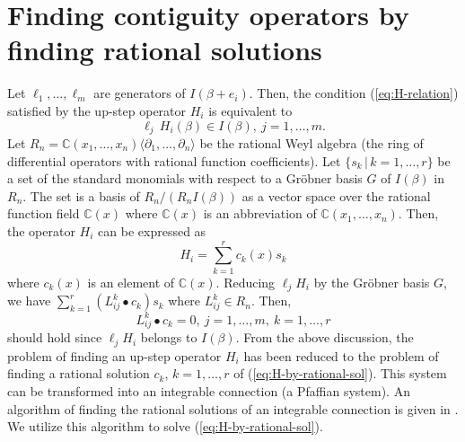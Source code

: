 \documentclass{article}
\def\CC{\mathbb{C}}
\def\pd#1{\partial_{#1}}
\begin{document}
\section{Finding contiguity operators by finding rational solutions} \label{sec:rat-sol}

Let $\ell_1, \ldots, \ell_m$ are generators of $I(\beta+e_i)$.
Then, the condition (\ref{eq:H-relation}) satisfied by the up-step operator $H_i$  
is equivalent to
\begin{equation}  \label{eq:H-relation2}
  \ell_j \, H_i(\beta) \in I(\beta), \ j=1, \ldots, m.
\end{equation}
Let $R_n=\CC(x_1, \ldots, x_n) \langle \pd{1}, \ldots, \pd{n}\rangle$
be the rational Weyl algebra (the ring of differential operators
with rational function coefficients).
Let $\{ s_k \,|\, k=1, \ldots, r\}$ be a set of the standard monomials
with respect to a Gr\"obner basis $G$ of $I(\beta)$ in $R_n$.
The set is a basis of 
$R_n/(R_n I(\beta))$ as a vector space over the rational function field
$\CC(x)$ where $\CC(x)$ is an abbreviation of $\CC(x_1, \ldots, x_n)$.
Then, the operator $H_i$ can be expressed as
\begin{equation}
 H_i = \sum_{k=1}^r c_k(x) s_k 
\end{equation}
where $c_k(x)$ is an element of $\CC(x)$.
Reducing $\ell_j H_i$ by the  Gr\"obner basis $G$,
we have 
$\sum_{k=1}^r (L_{ij}^k \bullet c_k) s_k$
where $L_{ij}^k \in R_n$.
Then, 
\begin{equation} \label{eq:H-by-rational-sol}
L_{ij}^k \bullet c_k = 0, \ j=1, \ldots, m, \ k=1, \ldots, r
\end{equation}
should hold since $\ell_j H_i$ belongs to $I(\beta)$.
From the above discussion, the problem of finding an up-step operator
$H_i$ has been reduced to the problem of finding a rational solution
$c_k$, $k=1, \ldots, r$
of (\ref{eq:H-by-rational-sol}).
This system can be transformed into an integrable connection
(a Pfaffian system).
An algorithm of finding the rational solutions of an integrable connection
is given in \cite{barkatou-2012}.
We utilize this algorithm to solve (\ref{eq:H-by-rational-sol}).
\end{document}
